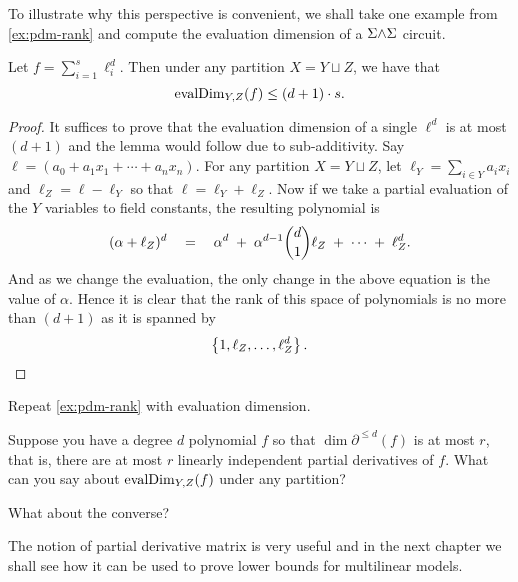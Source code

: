 To illustrate why this perspective is convenient, we shall take one example from \autoref{ex:pdm-rank} and compute the evaluation dimension of a $\Sigma\mathord{\wedge}\Sigma$ circuit. 

\begin{claim}
    Let $f = \sum_{i=1}^s \ell_i^d$. Then under any partition $X = Y \sqcup Z$, we have that
    \[
        \operatorname{evalDim}_{Y,Z}(f) \leq (d+1) \cdot s.
    \]
\end{claim}
\begin{proof}
  It suffices to prove that the evaluation dimension of a single $\ell^d$ is at most $(d+1)$ and the lemma would follow due to sub-additivity.
Say $\ell = (a_0 + a_1 x_1 + \cdots + a_nx_n)$.
For any partition $X = Y \sqcup Z$, let $\ell_Y = \sum_{i\in Y} a_i x_i$ and $\ell_Z = \ell - \ell_Y$ so that $\ell = \ell_Y + \ell_Z$. Now if we take a partial evaluation of the $Y$ variables to field constants, the resulting polynomial is 
\[
(\alpha + \ell_Z)^d \quad = \quad \alpha^d \;+\; \alpha^{d-1} \binom{d}{1} \ell_Z \;+\; \cdots \;+\; \ell_Z^d. 
\]
And as we change the evaluation, the only change in the above equation is the value of $\alpha$. Hence it is clear that the rank of this space of polynomials is no more than $(d+1)$ as it is spanned by 
\[
\left\{1, \ell_Z, \ldots, \ell_Z^d\right\}.\qedhere
\]
\end{proof}

\begin{exercise}
Repeat \autoref{ex:pdm-rank} with evaluation dimension. 
\end{exercise}

\begin{exercise}
Suppose you have a degree $d$ polynomial $f$ so that $\dim{\partial^{\leq d}(f)}$ is at most $r$, that is, there are at most $r$ linearly independent partial derivatives of $f$. What can you say about $\operatorname{evalDim}_{Y,Z}(f)$ under any partition? 

What about the converse?
\end{exercise}

\bigskip 

The notion of partial derivative matrix is very useful and in the next chapter we shall see how it can be used to prove lower bounds for multilinear models.

